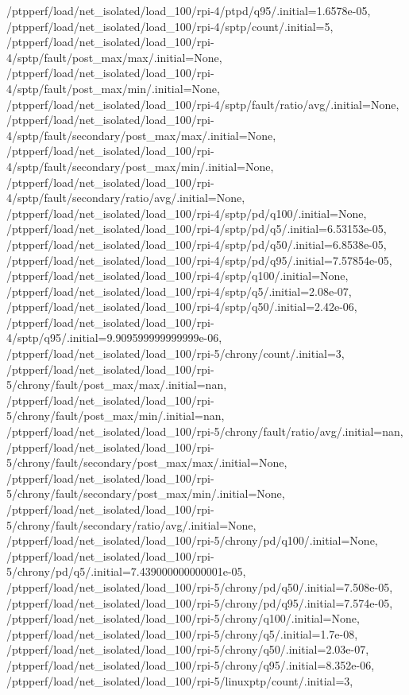 {    /ptpperf/load/net_isolated/load_100/rpi-4/ptpd/q95/.initial=1.6578e-05,
    /ptpperf/load/net_isolated/load_100/rpi-4/sptp/count/.initial=5,
    /ptpperf/load/net_isolated/load_100/rpi-4/sptp/fault/post_max/max/.initial=None,
    /ptpperf/load/net_isolated/load_100/rpi-4/sptp/fault/post_max/min/.initial=None,
    /ptpperf/load/net_isolated/load_100/rpi-4/sptp/fault/ratio/avg/.initial=None,
    /ptpperf/load/net_isolated/load_100/rpi-4/sptp/fault/secondary/post_max/max/.initial=None,
    /ptpperf/load/net_isolated/load_100/rpi-4/sptp/fault/secondary/post_max/min/.initial=None,
    /ptpperf/load/net_isolated/load_100/rpi-4/sptp/fault/secondary/ratio/avg/.initial=None,
    /ptpperf/load/net_isolated/load_100/rpi-4/sptp/pd/q100/.initial=None,
    /ptpperf/load/net_isolated/load_100/rpi-4/sptp/pd/q5/.initial=6.53153e-05,
    /ptpperf/load/net_isolated/load_100/rpi-4/sptp/pd/q50/.initial=6.8538e-05,
    /ptpperf/load/net_isolated/load_100/rpi-4/sptp/pd/q95/.initial=7.57854e-05,
    /ptpperf/load/net_isolated/load_100/rpi-4/sptp/q100/.initial=None,
    /ptpperf/load/net_isolated/load_100/rpi-4/sptp/q5/.initial=2.08e-07,
    /ptpperf/load/net_isolated/load_100/rpi-4/sptp/q50/.initial=2.42e-06,
    /ptpperf/load/net_isolated/load_100/rpi-4/sptp/q95/.initial=9.909599999999999e-06,
    /ptpperf/load/net_isolated/load_100/rpi-5/chrony/count/.initial=3,
    /ptpperf/load/net_isolated/load_100/rpi-5/chrony/fault/post_max/max/.initial=nan,
    /ptpperf/load/net_isolated/load_100/rpi-5/chrony/fault/post_max/min/.initial=nan,
    /ptpperf/load/net_isolated/load_100/rpi-5/chrony/fault/ratio/avg/.initial=nan,
    /ptpperf/load/net_isolated/load_100/rpi-5/chrony/fault/secondary/post_max/max/.initial=None,
    /ptpperf/load/net_isolated/load_100/rpi-5/chrony/fault/secondary/post_max/min/.initial=None,
    /ptpperf/load/net_isolated/load_100/rpi-5/chrony/fault/secondary/ratio/avg/.initial=None,
    /ptpperf/load/net_isolated/load_100/rpi-5/chrony/pd/q100/.initial=None,
    /ptpperf/load/net_isolated/load_100/rpi-5/chrony/pd/q5/.initial=7.439000000000001e-05,
    /ptpperf/load/net_isolated/load_100/rpi-5/chrony/pd/q50/.initial=7.508e-05,
    /ptpperf/load/net_isolated/load_100/rpi-5/chrony/pd/q95/.initial=7.574e-05,
    /ptpperf/load/net_isolated/load_100/rpi-5/chrony/q100/.initial=None,
    /ptpperf/load/net_isolated/load_100/rpi-5/chrony/q5/.initial=1.7e-08,
    /ptpperf/load/net_isolated/load_100/rpi-5/chrony/q50/.initial=2.03e-07,
    /ptpperf/load/net_isolated/load_100/rpi-5/chrony/q95/.initial=8.352e-06,
    /ptpperf/load/net_isolated/load_100/rpi-5/linuxptp/count/.initial=3,
}

